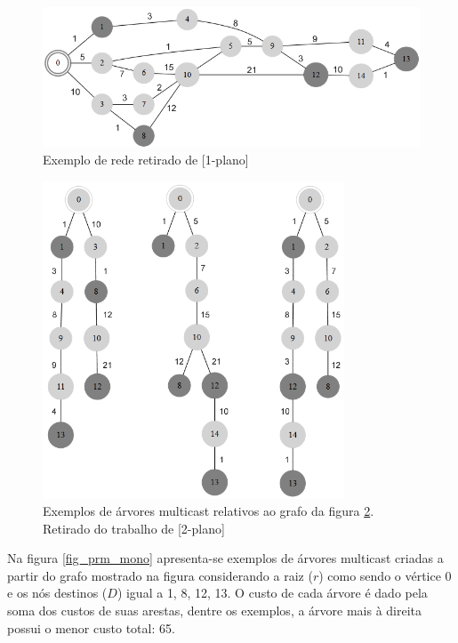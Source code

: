 \begin{figure}
	\label{fig_prm_grafo}
	\caption{Exemplo de rede retirado de [1-plano]}
	\centering
	\includegraphics[width=1\textwidth]{cap_problemas/figs/prm_grafo}
\end{figure}

\begin{figure}
	\label{fig_prm_grafo}
	\caption{Exemplos de árvores multicast relativos ao grafo da figura \ref{fig_prm_grafo}. Retirado do trabalho de [2-plano]}
	\centering
	\includegraphics[width=0.8\textwidth]{cap_problemas/figs/prm_mono}
\end{figure}

Na figura \ref{fig_prm_mono} apresenta-se exemplos de árvores multicast criadas a partir do grafo mostrado na figura \label{fig_prm_grafo} considerando a raiz ($r$) como sendo o vértice 0 e os nós destinos ($D$) igual a {1, 8, 12, 13}. O custo de cada árvore é dado pela soma dos custos de suas arestas, dentre os exemplos, a árvore mais à direita possui o menor custo total: 65.

